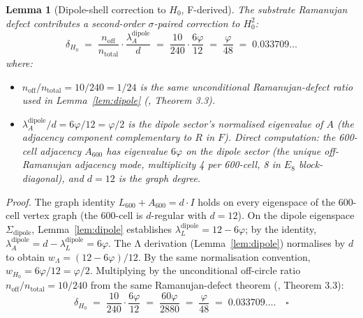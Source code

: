 \documentclass[11pt]{article}
\theoremstyle{plain}
\newtheorem{lemma}[theorem]{Lemma}
\theoremstyle{definition}
\theoremstyle{remark}
\begin{document}
\begin{lemma}[Dipole-shell correction to $H_0$, F-derived]\label{lem:dipole-H0}
The substrate Ramanujan defect contributes a second-order $\sigma$-paired correction to $H_0^2$:
\[
  \delta_{H_0} \;=\; \frac{n_\mathrm{off}}{n_\mathrm{total}} \cdot \frac{\lambda_A^\mathrm{dipole}}{d} \;=\; \frac{10}{240} \cdot \frac{6\varphi}{12} \;=\; \frac{\varphi}{48} \;=\; 0.033709\ldots
\]
where:
\begin{itemize}[leftmargin=2em]
\item $n_\mathrm{off}/n_\mathrm{total} = 10/240 = 1/24$ is the same unconditional Ramanujan-defect ratio used in Lemma~\ref{lem:dipole} (\citealp{rhTwoSphere}, Theorem 3.3).
\item $\lambda_A^\mathrm{dipole}/d = 6\varphi/12 = \varphi/2$ is the dipole sector's normalised eigenvalue of $A$ (the adjacency component complementary to $R$ in $F$). Direct computation: the 600-cell adjacency $A_{600}$ has eigenvalue $6\varphi$ on the dipole sector (the unique off-Ramanujan adjacency mode, multiplicity 4 per 600-cell, 8 in $E_8$ block-diagonal), and $d = 12$ is the graph degree.
\end{itemize}
\end{lemma}

\noindent\emph{Proof.} The graph identity $L_{600} + A_{600} = d \cdot I$ holds on every eigenspace of the 600-cell vertex graph (the 600-cell is $d$-regular with $d = 12$). On the dipole eigenspace $\Sigma_\mathrm{dipole}$, Lemma~\ref{lem:dipole} establishes $\lambda_L^\mathrm{dipole} = 12 - 6\varphi$; by the identity, $\lambda_A^\mathrm{dipole} = d - \lambda_L^\mathrm{dipole} = 6\varphi$. The Λ derivation (Lemma~\ref{lem:dipole}) normalises by $d$ to obtain $w_\Lambda = (12 - 6\varphi)/12$. By the same normalisation convention, $w_{H_0} = 6\varphi/12 = \varphi/2$. Multiplying by the unconditional off-circle ratio $n_\mathrm{off}/n_\mathrm{total} = 10/240$ from the same Ramanujan-defect theorem (\citealp{rhTwoSphere}, Theorem 3.3):
\[
  \delta_{H_0} \;=\; \frac{10}{240} \cdot \frac{6\varphi}{12} \;=\; \frac{60\varphi}{2880} \;=\; \frac{\varphi}{48} \;=\; 0.033709\ldots. \quad\square
\]
\end{document}
